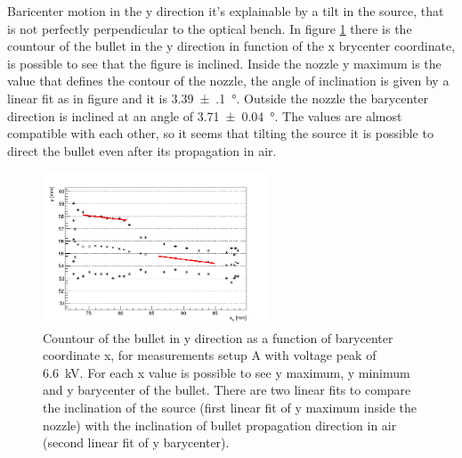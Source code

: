 Baricenter motion in the y direction it's explainable by a tilt in the source, that is not perfectly perpendicular to the optical bench. In figure \ref{fig:elio_d035_diry} there is the countour of the bullet in the y direction in function of the x brycenter coordinate, is possible to see that the figure is inclined. Inside the nozzle y maximum is the value that defines the contour of the nozzle, the angle of inclination is given by a linear fit as in figure and it is \SI{3.39(10)}{\degree}. Outside the nozzle the barycenter direction is inclined at an angle of \SI{3.71(4)}{\degree}. The values are almost compatible with each other, so it seems that tilting the source it is possible to direct the bullet even after its propagation in air.
\begin{figure}
 \centering
 \includegraphics[width=0.6\textwidth]{Images/Shape/elio_d035_incl.png}
 \caption{Countour of the bullet in y direction as a function of barycenter coordinate x, for measurements setup A with voltage peak of \SI{6.6}{\kilo\volt}. For each x value is possible to see y maximum, y minimum and y barycenter of the bullet. There are two linear fits to compare the inclination of the source (first linear fit of y maximum inside the nozzle) with the inclination of bullet propagation direction in air (second linear fit of y barycenter).}
 \label{fig:elio_d035_diry}
\end{figure}


